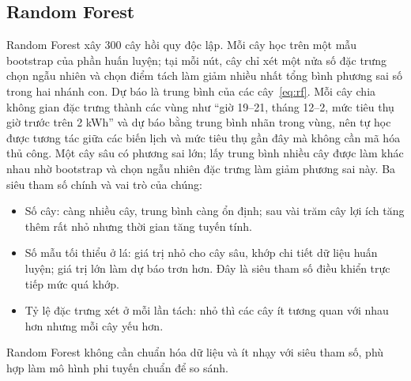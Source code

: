 \subsection{Random Forest}
Random Forest xây 300 cây hồi quy độc lập. Mỗi cây học trên một mẫu bootstrap của phần huấn luyện; tại mỗi nút, cây chỉ xét một nửa số đặc trưng chọn ngẫu nhiên và chọn điểm tách làm giảm nhiều nhất tổng bình phương sai số trong hai nhánh con. Dự báo là trung bình của các cây~\eqref{eq:rf}. Mỗi cây chia không gian đặc trưng thành các vùng như ``giờ 19--21, tháng 12--2, mức tiêu thụ giờ trước trên 2 kWh'' và dự báo bằng trung bình nhãn trong vùng, nên tự học được tương tác giữa các biến lịch và mức tiêu thụ gần đây mà không cần mã hóa thủ công. Một cây sâu có phương sai lớn; lấy trung bình nhiều cây được làm khác nhau nhờ bootstrap và chọn ngẫu nhiên đặc trưng làm giảm phương sai này. Ba siêu tham số chính và vai trò của chúng:
\begin{itemize}
    \item Số cây: càng nhiều cây, trung bình càng ổn định; sau vài trăm cây lợi ích tăng thêm rất nhỏ nhưng thời gian tăng tuyến tính.
    \item Số mẫu tối thiểu ở lá: giá trị nhỏ cho cây sâu, khớp chi tiết dữ liệu huấn luyện; giá trị lớn làm dự báo trơn hơn. Đây là siêu tham số điều khiển trực tiếp mức quá khớp.
    \item Tỷ lệ đặc trưng xét ở mỗi lần tách: nhỏ thì các cây ít tương quan với nhau hơn nhưng mỗi cây yếu hơn.
\end{itemize}
Random Forest không cần chuẩn hóa dữ liệu và ít nhạy với siêu tham số, phù hợp làm mô hình phi tuyến chuẩn để so sánh.

